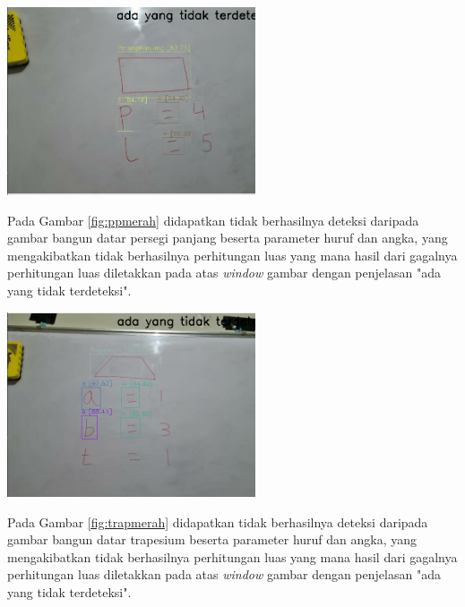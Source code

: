 \begin{center}
	\includegraphics[width=0.55\textwidth]{gambar/persegipanjang merah.png}
	\label{fig:ppmerah}
\end{center}
Pada Gambar \ref{fig:ppmerah} didapatkan tidak berhasilnya deteksi daripada gambar bangun datar persegi panjang beserta parameter huruf dan angka, yang mengakibatkan tidak berhasilnya perhitungan luas yang mana hasil dari gagalnya perhitungan luas diletakkan pada atas \textit{window} gambar dengan penjelasan "ada yang tidak terdeteksi".

\begin{center}
	\includegraphics[width=0.55\textwidth]{gambar/trapesium merah.png}
	\label{fig:trapmerah}
\end{center}
Pada Gambar \ref{fig:trapmerah} didapatkan tidak berhasilnya deteksi daripada gambar bangun datar trapesium beserta parameter huruf dan angka, yang mengakibatkan tidak berhasilnya perhitungan luas yang mana hasil dari gagalnya perhitungan luas diletakkan pada atas \textit{window} gambar dengan penjelasan "ada yang tidak terdeteksi".


